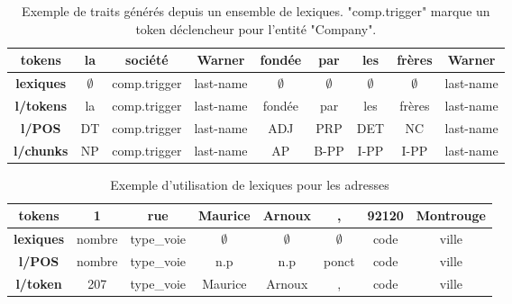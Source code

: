 \documentclass[12pt,a4paper,times,twoside,openright]{report}
\begin{document}
\begin{table}[ht!]
\centering
\begin{tabular}{|c|cccccccc|}
\hline
\textbf{tokens}      & la          & société         & Warner       & fondée          & par         & les         & frères      & Warner \\
\hline
\textbf{lexiques} & $\emptyset$  & comp.trigger & last-name    & $\emptyset$     & $\emptyset$ & $\emptyset$ & $\emptyset$ & last-name \\
\textbf{l/tokens}    & la          & comp.trigger & last-name    & fondée          & par         & les         & frères      & last-name \\
\textbf{l/POS}     & DT          & comp.trigger & last-name    & ADJ             & PRP         & DET         & NC          & last-name \\
\textbf{l/chunks}  & NP          & comp.trigger & last-name    & AP              & B-PP        & I-PP        & I-PP        & last-name \\
\hline
\end{tabular}
\caption{Exemple de traits générés depuis un ensemble de lexiques. "comp.trigger" marque un token déclencheur pour l'entité "Company".}
\label{tab:ontology-company-vs-person}
\end{table}

\begin{table}[ht!]
\centering
\begin{tabular}{|c|ccccccc|}
\hline
\textbf{tokens}      & 1      & rue        & Maurice     & Arnoux      & ,           & 92120 & Montrouge \\
\hline
\textbf{lexiques}  & nombre & type\_voie & $\emptyset$ & $\emptyset$ & $\emptyset$ & code  & ville \\
\textbf{l/POS}     & nombre & type\_voie & n.p         & n.p         & ponct       & code  & ville \\
\textbf{l/token}     & 207    & type\_voie & Maurice     & Arnoux      & ,           & code  & ville \\
\hline
\end{tabular}
\caption{Exemple d'utilisation de lexiques pour les adresses}
\label{tab:ontology-address-example}
\end{table}
\end{document}
